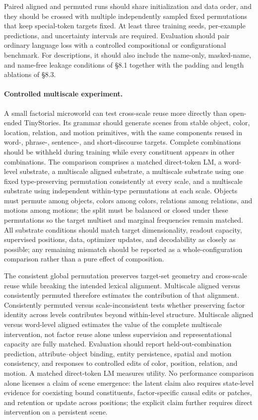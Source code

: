 \documentclass[11pt,a4paper]{article}
\begin{document}
Paired aligned and permuted runs should share initialization and data order, and they should be crossed with multiple independently sampled fixed permutations that keep special-token targets fixed. At least three training seeds, per-example predictions, and uncertainty intervals are required. Evaluation should pair ordinary language loss with a controlled compositional or configurational benchmark. For descriptions, it should also include the name-only, masked-name, and name-free leakage conditions of §8.1 together with the padding and length ablations of §8.3.

\paragraph{Controlled multiscale experiment.} A small factorial microworld can test cross-scale reuse more directly than open-ended TinyStories. Its grammar should generate scenes from stable object, color, location, relation, and motion primitives, with the same components reused in word-, phrase-, sentence-, and short-discourse targets. Complete combinations should be withheld during training while every constituent appears in other combinations. The comparison comprises a matched direct-token LM, a word-level substrate, a multiscale aligned substrate, a multiscale substrate using one fixed type-preserving permutation consistently at every scale, and a multiscale substrate using independent within-type permutations at each scale. Objects must permute among objects, colors among colors, relations among relations, and motions among motions; the split must be balanced or closed under these permutations so the target multiset and marginal frequencies remain matched. All substrate conditions should match target dimensionality, readout capacity, supervised positions, data, optimizer updates, and decodability as closely as possible; any remaining mismatch should be reported as a whole-configuration comparison rather than a pure effect of composition.

The consistent global permutation preserves target-set geometry and cross-scale reuse while breaking the intended lexical alignment. Multiscale aligned versus consistently permuted therefore estimates the contribution of that alignment. Consistently permuted versus scale-inconsistent tests whether preserving factor identity across levels contributes beyond within-level structure. Multiscale aligned versus word-level aligned estimates the value of the complete multiscale intervention, not factor reuse alone unless supervision and representational capacity are fully matched. Evaluation should report held-out-combination prediction, attribute--object binding, entity persistence, spatial and motion consistency, and responses to controlled edits of color, position, relation, and motion. A matched direct-token LM measures utility. No performance comparison alone licenses a claim of scene emergence: the latent claim also requires state-level evidence for coexisting bound constituents, factor-specific causal edits or patches, and retention or update across positions; the explicit claim further requires direct intervention on a persistent scene.
\end{document}
